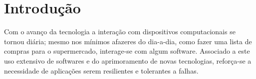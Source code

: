 \documentclass[
    12pt,
    openright, 
    oneside,
    a4paper,
    french,
    english,
    brazil
    ]{facom-ufu-abntex2}
\theoremstyle{definition}
\begin{document}
\imprimircapa
\imprimirfolhaderosto









\tableofcontents*
\cleardoublepage


\textual


\chapter{Introdução}

Com o avanço da tecnologia a interação com dispositivos computacionais se tornou diária; mesmo
nos mínimos afazeres do dia-a-dia, como fazer uma lista de compras para o supermercado, interage-se com algum software. 
Associado a este uso extensivo de softwares e do aprimoramento de novas tecnologias,  reforça-se a necessidade de aplicações serem resilientes e tolerantes a falhas.
\end{document}
